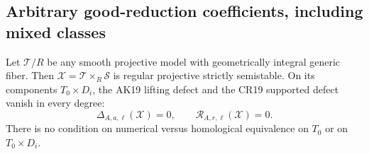 \subsection{Arbitrary good-reduction coefficients, including mixed classes}

\begin{proposition}
\label{r20as:good-coefficient}
Let $\mathcal T/R$ be any smooth projective model with geometrically
integral generic fiber.  Then
$\mathcal X=\mathcal T\times_R\mathcal S$ is regular projective
strictly semistable.  On its components $T_0\times D_i$, the
AK19 lifting defect and the CR19 supported defect vanish in every
degree:
\[
                 \Delta_{A,a,\ell}(\mathcal X)=0,
       \qquad \mathscr R_{A,r,\ell}(\mathcal X)=0.
 \tag{AS20.7}\label{r20as:coefficient-defects}
\]
There is no condition on numerical versus homological equivalence
on $T_0$ or on $T_0\times D_i$.
\end{proposition}

